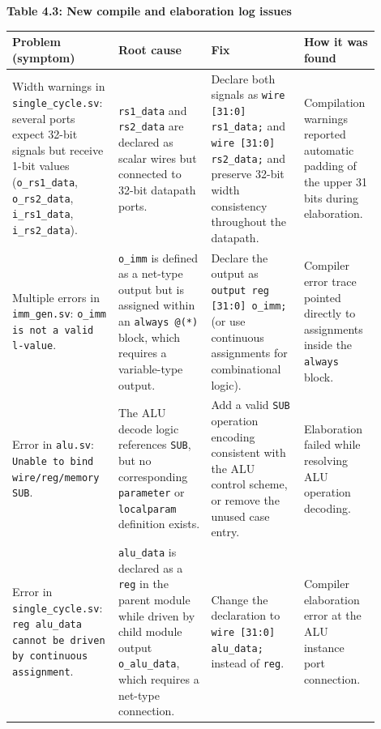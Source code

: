 \documentclass[10pt,a4paper]{article}
\begin{document}
\textbf{Table 4.3: New compile and elaboration log issues}

\begin{center}
\small
\begin{tabular}{@{}p{0.24\linewidth}p{0.24\linewidth}p{0.24\linewidth}p{0.18\linewidth}@{}}
\toprule
\textbf{Problem (symptom)} & \textbf{Root cause} & \textbf{Fix} & \textbf{How it was found} \\
\midrule
Width warnings in \texttt{single\_cycle.sv}: several ports expect 32-bit signals but receive 1-bit values (\texttt{o\_rs1\_data}, \texttt{o\_rs2\_data}, \texttt{i\_rs1\_data}, \texttt{i\_rs2\_data}). &
\texttt{rs1\_data} and \texttt{rs2\_data} are declared as scalar wires but connected to 32-bit datapath ports. &
Declare both signals as \texttt{wire [31:0] rs1\_data;} and \texttt{wire [31:0] rs2\_data;} and preserve 32-bit width consistency throughout the datapath. &
Compilation warnings reported automatic padding of the upper 31 bits during elaboration. \\
\addlinespace
Multiple errors in \texttt{imm\_gen.sv}: \texttt{o\_imm is not a valid l-value}. &
\texttt{o\_imm} is defined as a net-type output but is assigned within an \texttt{always @(*)} block, which requires a variable-type output. &
Declare the output as \texttt{output reg [31:0] o\_imm;} (or use continuous assignments for combinational logic). &
Compiler error trace pointed directly to assignments inside the \texttt{always} block. \\
\addlinespace
Error in \texttt{alu.sv}: \texttt{Unable to bind wire/reg/memory SUB}. &
The ALU decode logic references \texttt{SUB}, but no corresponding \texttt{parameter} or \texttt{localparam} definition exists. &
Add a valid \texttt{SUB} operation encoding consistent with the ALU control scheme, or remove the unused case entry. &
Elaboration failed while resolving ALU operation decoding. \\
\addlinespace
Error in \texttt{single\_cycle.sv}: \texttt{reg alu\_data cannot be driven by continuous assignment}. &
\texttt{alu\_data} is declared as a \texttt{reg} in the parent module while driven by child module output \texttt{o\_alu\_data}, which requires a net-type connection. &
Change the declaration to \texttt{wire [31:0] alu\_data;} instead of \texttt{reg}. &
Compiler elaboration error at the ALU instance port connection. \\
\bottomrule
\end{tabular}
\end{center}
\end{document}
